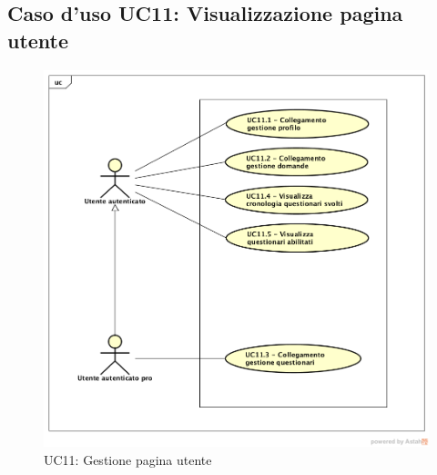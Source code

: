 \newpage
\subsection{Caso d'uso UC11: Visualizzazione pagina utente}
\label{UC11}
\begin{figure}[h]
	\centering
	\includegraphics[scale=0.5]{UML/UC11.png}
	\caption{UC11: Gestione pagina utente}
\end{figure}

